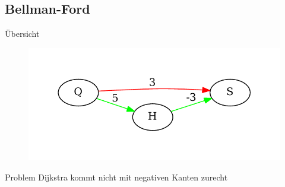 \subsection{Bellman-Ford}
\begin{frame}{Übersicht}
\begin{figure}[htbp]
\centering
\includegraphics[width=\linewidth]{dijkstra_gegenbeispiel.pdf}
\end{figure}
\begin{alertblock}{Problem}
Dijkstra kommt nicht mit negativen Kanten zurecht
\end{alertblock}
\end{frame}


